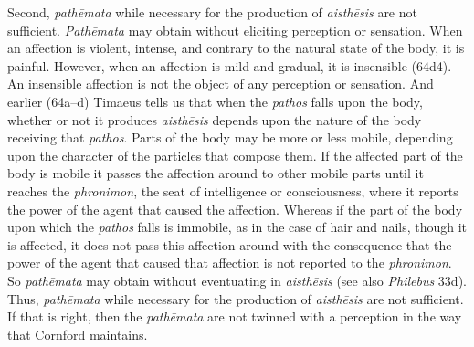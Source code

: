 Second, \emph{pathēmata} while necessary for the production of \emph{aisthēsis} are not sufficient. \emph{Pathēmata} may obtain without eliciting perception or sensation. When an affection is violent, intense, and contrary to the natural state of the body, it is painful. However, when an affection is mild and gradual, it is insensible (64d4). An insensible affection is not the object of any perception or sensation. And earlier (64a--d) Timaeus tells us that when the \emph{pathos} falls upon the body, whether or not it produces \emph{aisthēsis} depends upon the nature of the body receiving that \emph{pathos}. Parts of the body may be more or less mobile, depending upon the character of the particles that compose them. If the affected part of the body is mobile it passes the affection around to other mobile parts until it reaches the \emph{phronimon}, the seat of intelligence or consciousness, where it reports the power of the agent that caused the affection. Whereas if the part of the body upon which the \emph{pathos} falls is immobile, as in the case of hair and nails, though it is affected, it does not pass this affection around with the consequence that the power of the agent that caused that affection is not reported to the \emph{phronimon}. So \emph{pathēmata} may obtain without eventuating in \emph{aisthēsis} (see also \emph{Philebus} 33d). Thus, \emph{pathēmata} while necessary for the production of \emph{aisthēsis} are not sufficient. If that is right, then the \emph{pathēmata} are not twinned with a perception in the way that Cornford maintains.

